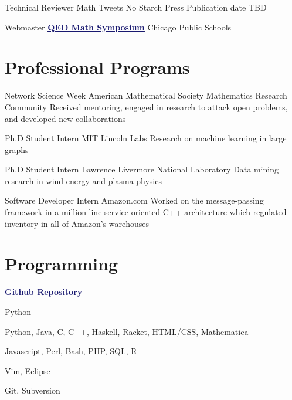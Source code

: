 \documentclass[11pt]{moderncv}
\begin{document}
         {Technical Reviewer}
      {Math Tweets}
      {No Starch Press}
      {}
      {Publication date TBD}

         {Webmaster}
      {\href{http://qed.wpcp.org/}{\textcolor{MidnightBlue}{\underline{\textbf{QED Math Symposium}}}}}
      {Chicago Public Schools}
      {}
{}


   \section{Professional Programs}
         {Network Science Week}
      {American Mathematical Society Mathematics Research Community}
      {}
      {}
      {Received mentoring, engaged in research to attack open problems, and developed new collaborations}

         {Ph.D Student Intern}
      {MIT Lincoln Labs}
      {}
      {}
      {Research on machine learning in large graphs}

         {Ph.D Student Intern}
      {Lawrence Livermore National Laboratory}
      {}
      {}
      {Data mining research in wind energy and plasma physics}

         {Software Developer Intern}
      {Amazon.com}
      {}
      {}
      {Worked on the message-passing framework in a million-line service-oriented C++ architecture which regulated inventory in all of Amazon's warehouses}


   \section{Programming}
         {\href{https://github.com/j2kun/}{\textcolor{MidnightBlue}{\underline{\textbf{Github Repository}}}}}
      {}
{}
      {}
      {}

         {Python}
      {}
{}
      {}
      {}

         {Python, Java, C, C++, Haskell, Racket, HTML/CSS, Mathematica}
      {}
{}
      {}
      {}

         {Javascript, Perl, Bash, PHP, SQL, R}
      {}
{}
      {}
      {}

         {Vim, Eclipse}
      {}
{}
      {}
      {}

         {Git, Subversion}
      {}
{}
      {}
      {}
\end{document}
